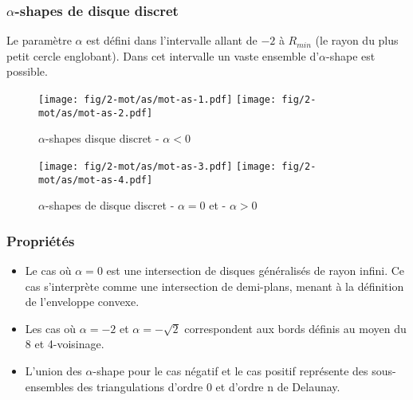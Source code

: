 \subsubsection{$\alpha$-shapes de disque discret}

Le paramètre $\alpha$ est défini dans l'intervalle allant de $-2$ à $R_{min}$ (le rayon du plus petit cercle englobant). 
Dans cet intervalle un vaste ensemble d'$\alpha$-shape est possible.  

\begin{figure}[H]
  \centering
  \texttt{[image: fig/2-mot/as/mot-as-1.pdf]}
  \texttt{[image: fig/2-mot/as/mot-as-2.pdf]}
  \caption{$\alpha$-shapes disque discret - $\alpha < 0$}
\end{figure}

\begin{figure}[H]
  \centering
  \texttt{[image: fig/2-mot/as/mot-as-3.pdf]}
  \texttt{[image: fig/2-mot/as/mot-as-4.pdf]}
  \caption{$\alpha$-shapes de disque discret - $\alpha = 0$ et - $\alpha > 0$}
\end{figure}



\subsubsection{Propriétés}


\begin{itemize}
  \item Le cas où $\alpha = 0$ est une intersection de disques généralisés de rayon infini. Ce cas s'interprète comme une intersection de demi-plans, menant à la définition de l'enveloppe convexe.
  \item Les cas où $\alpha = -2$ et $\alpha = -\sqrt{2}$ correspondent aux bords définis au moyen du 8 et 4-voisinage. 
  \item L'union des $\alpha$-shape \cite{EdeKirSei83} pour le cas négatif et le cas positif représente des sous-ensembles des triangulations d'ordre 0 et d'ordre n de Delaunay.   
\end{itemize}
 
